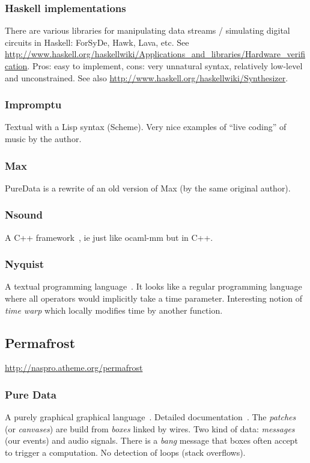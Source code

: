 \documentclass[a4paper,titlepage]{article}
\begin{document}
\subsubsection{Haskell implementations}
There are various libraries for manipulating data streams / simulating digital
circuits in Haskell: ForSyDe, Hawk, Lava, etc. See
\url{http://www.haskell.org/haskellwiki/Applications_and_libraries/Hardware_verification}. Pros:
easy to implement, cons: very unnatural syntax, relatively low-level and
unconstrained. See also \url{http://www.haskell.org/haskellwiki/Synthesizer}.

\subsubsection{Impromptu}
\cite{impromptu} Textual with a Lisp syntax (Scheme). Very nice examples of ``live
coding'' of music by the author.

\subsubsection{Max}
\cite{max}
PureData is a rewrite of an old version of Max (by the same original author).

\subsubsection{Nsound}
A C++ framework~\cite{nsound}, ie just like ocaml-mm but in C++.

\subsubsection{Nyquist}
A textual programming language~\cite{nyquist}. It looks like a regular
programming language where all operators would implicitly take a time
parameter. Interesting notion of \emph{time warp} which locally modifies time by
another function.

\subsection{Permafrost}
\url{http://naspro.atheme.org/permafrost}

\subsubsection{Pure Data}
A purely graphical graphical language~\cite{puredata}. Detailed
documentation~\cite{pd-doc}. The \emph{patches} (or \emph{canvases}) are build
from \emph{boxes} linked by wires. Two kind of data: \emph{messages} (our
events) and audio signals. There is a \emph{bang} message that boxes often
accept to trigger a computation. No detection of loops (stack overflows).
\end{document}
